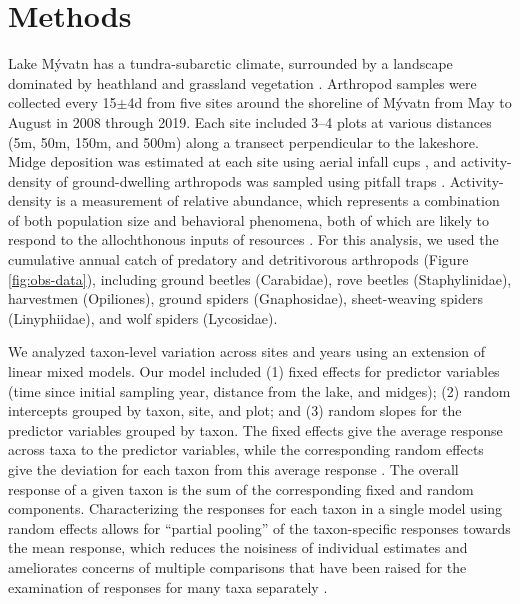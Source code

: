 

\section*{Methods}

Lake M\'{y}vatn has a tundra-subarctic climate, surrounded by a landscape
dominated by heathland and grassland vegetation \citep{Einarsson2004}.
Arthropod samples were collected every 15$\pm$4d from five sites around the
shoreline of M\'{y}vatn from May to August in 2008 through 2019.
Each site included 3--4 plots at various distances
(5m, 50m, 150m, and 500m) along a transect perpendicular to the lakeshore.
Midge deposition was estimated at each site using aerial infall cups \citep{Dreyer2015},
and activity-density of ground-dwelling arthropods was sampled using pitfall traps
\citep{Southwood2009}.
Activity-density is a measurement of relative abundance, which represents a combination
of both population size and behavioral phenomena, both of which are likely to respond
to the allochthonous inputs of resources \citep{Ostfeld2000}.
For this analysis, we used the cumulative annual catch of predatory and
detritivorous arthropods (Figure \ref{fig:obs-data}),
including ground beetles (Carabidae), rove beetles (Staphylinidae),
harvestmen (Opiliones), ground spiders (Gnaphosidae),
sheet-weaving spiders (Linyphiidae), and wolf spiders (Lycosidae).



We analyzed taxon-level variation across sites and years using an extension of
linear mixed models.
Our model included (1) fixed effects for predictor variables (time since initial
sampling year, distance from the lake, and midges);
(2) random intercepts grouped by taxon, site, and plot; and
(3) random slopes for the predictor variables grouped by taxon.
The fixed effects give the average response across taxa to the predictor variables,
while the corresponding random effects give the deviation for each taxon from this
average response \citep{Jackson2012}.
The overall response of a given taxon is the sum of the corresponding fixed and
random components.
Characterizing the responses for each taxon in a single model using random effects
allows for “partial pooling” of the taxon-specific responses towards the mean response,
which reduces the noisiness of individual estimates and ameliorates concerns of multiple
comparisons \citep{Gelman2012} that have been raised for the examination of
responses for many taxa separately \citep{Mcgarigal2013}.



